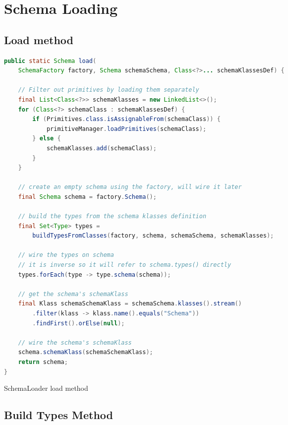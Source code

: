 
\chapter{Schema Loading}\label{appdx:SchemaLoading}

\section{Load method}

\begin{sourcecode} [H]
	\begin{lstlisting}[language=Java, escapechar=|]
public static Schema load(
	SchemaFactory factory, Schema schemaSchema, Class<?>... schemaKlassesDef) {

	// Filter out primitives by loading them separately
	final List<Class<?>> schemaKlasses = new LinkedList<>();
	for (Class<?> schemaClass : schemaKlassesDef) {
		if (Primitives.class.isAssignableFrom(schemaClass)) {
			primitiveManager.loadPrimitives(schemaClass);
		} else {
			schemaKlasses.add(schemaClass);
		}
	}

	// create an empty schema using the factory, will wire it later
	final Schema schema = factory.Schema();

	// build the types from the schema klasses definition
	final Set<Type> types = 
		buildTypesFromClasses(factory, schema, schemaSchema, schemaKlasses);

	// wire the types on schema
	// it is inverse so it will refer to schema.types() directly
	types.forEach(type -> type.schema(schema));

	// get the schema's schemaKlass
	final Klass schemaSchemaKlass = schemaSchema.klasses().stream()
		.filter(klass -> klass.name().equals("Schema"))
		.findFirst().orElse(null);

	// wire the schema's schemaKlass
	schema.schemaKlass(schemaSchemaKlass);
	return schema;
}
	\end{lstlisting}
	\caption{SchemaLoader load method}
	\label{lst:SchemaLoader_load}
\end{sourcecode}

\section{Build Types Method}

